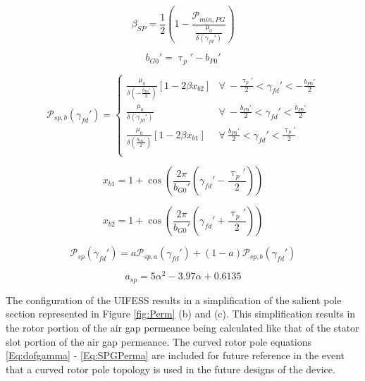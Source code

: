 \begin{equation}\label{Eq:BetaSP}
	{\beta}_{SP} = \frac{1}{2} \left(1 - \frac{{\mathcal{P}}_{min,PG}}{\frac{{\mu}_{0}}{{\delta}({\gamma}_{fd}')}}\right)
\end{equation}

\begin{equation}\label{Eq:bg0}
	{b}_{G0}' = {\uptau}_{p}' - {b}_{P0}'
\end{equation}

\begin{equation}\label{Eq:SPGPermbs}
	\mathcal{P}_{sp,b}({\gamma}_{fd}') = 
	\begin{cases}
		\frac{{\mu}_{0}}{\delta(-\frac{{b}_{P0}'}{2})} \left[ 1 - 2\beta{x}_{b2} \right] & \forall \: -\frac{{\uptau}_{p}'}{2} < {\gamma}_{fd}' < -\frac{{b}_{P0}'}{2} \\ 
		\frac{{\mu}_{0}}{\delta({\gamma}_{fd}')} & \forall \: -\frac{{b}_{P0}'}{2} < {\gamma}_{fd}' < \frac{{b}_{P0}'}{2} \\
		\frac{{\mu}_{0}}{\delta(\frac{{b}_{P0}'}{2})} \left[ 1 - 2\beta{x}_{b1} \right] & \forall \: \frac{{b}_{P0}'}{2} < {\gamma}_{fd}' < \frac{{\uptau}_{p}'}{2} \\
	\end{cases}
\end{equation}

\begin{equation}\label{Eq:SPGPermbx1}
	{x}_{b1} = 1 + \cos\left(\frac{2\pi}{{b}_{G0}'} \left({\gamma}_{fd}' - \frac{{\uptau}_{p}'}{2}\right) \right)
\end{equation}

\begin{equation}\label{Eq:SPGPermbx2}
	{x}_{b2} = 1 + \cos\left(\frac{2\pi}{{b}_{G0}'} \left({\gamma}_{fd}' + \frac{{\uptau}_{p}'}{2}\right) \right)
\end{equation}

\begin{equation}\label{Eq:SPGPerm}
	\mathcal{P}_{sp}({\gamma}_{fd}') = a\mathcal{P}_{sp,a}({\gamma}_{fd}') + (1-a)\mathcal{P}_{sp,b}({\gamma}_{fd}')
\end{equation}

\begin{equation}\label{Eq:SPGPerma}
	a_{sp} = 5\alpha^{2} - 3.97\alpha + 0.6135
\end{equation}

The configuration of the UIFESS results in a simplification of the salient pole section represented in Figure \ref{fig:Perm} (b) and (c). This simplification results in the rotor portion of the air gap permeance being calculated like that of the stator slot portion of the air gap permeance. The curved rotor pole equations \ref{Eq:dofgamma} - \ref{Eq:SPGPerma} are included for future reference in the event that a curved rotor pole topology is used in the future designs of the device. 


